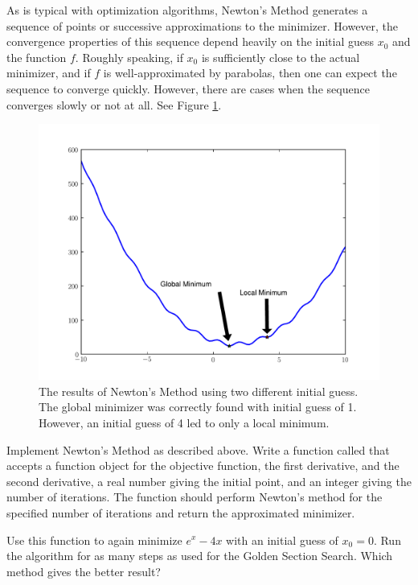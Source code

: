 As is typical with optimization algorithms, Newton's Method generates a sequence of
points or successive approximations to the minimizer. However, the convergence
properties of this sequence depend heavily on the initial guess $x_0$ and the function
$f$. Roughly speaking, if $x_0$ is sufficiently close to the actual minimizer, and if
$f$ is well-approximated by parabolas, then one can expect the sequence to converge
quickly. However, there are cases when the sequence converges slowly or not at all.
See Figure \ref{linesearch:newton}.

\begin{figure}
\centering
\includegraphics[width=\textwidth]{newton.pdf}
\caption{The results of Newton's Method using two
different initial guess. The global minimizer was
correctly found with initial guess of 1. However,
an initial guess of 4 led to only a local minimum.}
\label{linesearch:newton}
\end{figure}

\begin{problem}
Implement Newton's Method as described above. Write a function called  that
accepts a function object for the objective function, the first derivative, and the
second derivative, a real number giving the initial point, and an integer giving the number
of iterations. The function should perform Newton's method for the specified number of iterations
and return the approximated minimizer.

Use this function to again minimize $e^x - 4x$
with an initial guess of $x_0 = 0$. Run the algorithm for as many steps as used for the
Golden Section Search. Which method gives the better result?
\end{problem}

